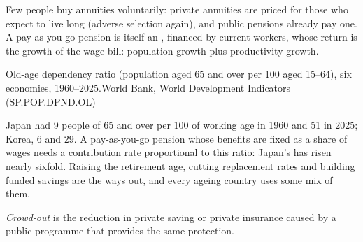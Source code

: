 Few people buy annuities voluntarily: private annuities are priced for those who
expect to live long (adverse selection again), and public pensions already pay
one. A pay-as-you-go pension is itself an , financed by current workers,
whose return is the growth of the wage bill: population growth plus productivity
growth.

\begin{omchart}{Old-age dependency ratio (population aged 65 and over per 100 aged
15--64), six economies, 1960--2025.}{World Bank, World Development Indicators
(SP.POP.DPND.OL)}
\end{omchart}

Japan had 9 people of 65 and over per 100 of working age in 1960 and 51 in 2025;
Korea, 6 and 29. A pay-as-you-go pension whose benefits are fixed as a share of
wages needs a contribution rate proportional to this ratio: Japan's has risen
nearly sixfold. Raising the retirement age, cutting replacement rates and building
funded savings are the ways out, and every ageing country uses some mix of them.

\begin{definition}\label{def:b3:social-insurance:crowd-out}
\emph{Crowd-out} is the reduction in private saving or private insurance caused by
a public programme that provides the same protection.
\end{definition}

